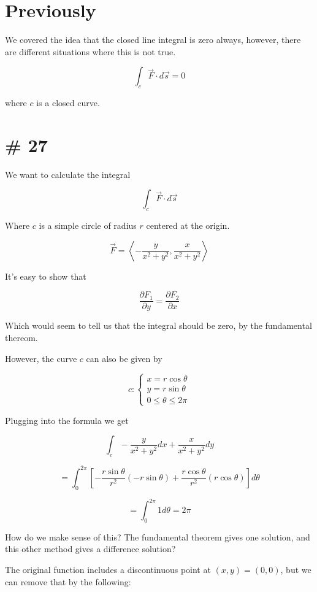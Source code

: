 \documentclass{article}
\begin{document}
\section*{Previously}

We covered the idea that the closed line integral is zero always, however, there are different situations where this is not true.

\[
\int_c \vec{F}\cdot d\vec{s} = 0
\]

where $c$ is a closed curve.

\hrulefill

\section*{\# 27}

We want to calculate the integral

\[
\int_c \vec{F}\cdot d\vec{s}
\]

Where $c$ is a simple circle of radius $r$ centered at the origin.

\[
\vec{F} = \left<-\dfrac{y}{x^2+y^2}, \dfrac{x}{x^2+y^2}\right>
\]

It's easy to show that

\[
\dfrac{\partial F_1}{\partial y} = \dfrac{\partial F_2}{\partial x}
\]

Which would seem to tell us that the integral should be zero, by the fundamental thereom.

However, the curve $c$ can also be given by

\[
c: \begin{cases}
  x = r \cos{\theta} \\
  y = r \sin{\theta} \\
  0 \le \theta \le 2\pi
\end{cases}
\]

Plugging into the formula we get

\[
\int_c -\dfrac{y}{x^2+y^2} dx + \dfrac{x}{x^2+y^2} dy
\]

\[
= \int_0^{2\pi} \left[-\dfrac{r \sin{\theta}}{r^2} \left(-r \sin{\theta}\right) + \dfrac{r \cos{\theta}}{r^2} \left(r \cos{\theta}\right)\right] d\theta
\]

\[
= \int_0^{2\pi} 1 d\theta = 2\pi
\]

How do we make sense of this? The fundamental theorem gives one solution, and this other method gives a difference solution?

The original function includes a discontinuous point at $(x,y)=(0,0)$, but we can remove that by the following:
\end{document}
